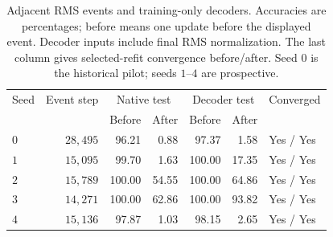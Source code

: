 \begin{table}[htbp]
\centering\small
\setlength{\tabcolsep}{4pt}
\caption{Adjacent RMS events and training-only decoders. Accuracies are percentages; before means one update before the displayed event. Decoder inputs include final RMS normalization. The last column gives selected-refit convergence before/after. Seed $0$ is the historical pilot; seeds $1$--$4$ are prospective.}
\label{tab:rms-event-decoders}
\begin{tabular}{lrrrrrl}
\toprule
Seed & Event step & \multicolumn{2}{c}{Native test} & \multicolumn{2}{c}{Decoder test} & Converged \\ & & Before & After & Before & After & \\
\midrule
$0$ & $28{,}495$ & 96.21 & 0.88 & 97.37 & 1.58 & Yes / Yes \\
$1$ & $15{,}095$ & 99.70 & 1.63 & 100.00 & 17.35 & Yes / Yes \\
$2$ & $15{,}789$ & 100.00 & 54.55 & 100.00 & 64.86 & Yes / Yes \\
$3$ & $14{,}271$ & 100.00 & 62.86 & 100.00 & 93.82 & Yes / Yes \\
$4$ & $15{,}136$ & 97.87 & 1.03 & 98.15 & 2.65 & Yes / Yes \\
\bottomrule
\end{tabular}
\end{table}
